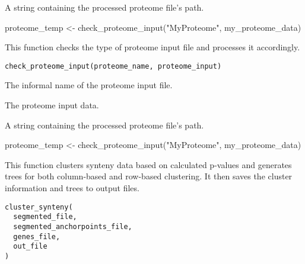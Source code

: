 \documentclass[a4paper]{book}
\begin{document}
%
\begin{Value}
A string containing the processed proteome file's path.
\end{Value}
%
\begin{Examples}
\begin{ExampleCode}
proteome_temp <- check_proteome_input("MyProteome", my_proteome_data)
\end{ExampleCode}
\end{Examples}
%
\begin{Description}\relax
This function checks the type of proteome input file and processes it accordingly.
\end{Description}
%
\begin{Usage}
\begin{verbatim}
check_proteome_input(proteome_name, proteome_input)
\end{verbatim}
\end{Usage}
%
\begin{Arguments}
\begin{ldescription}
\item[\code{proteome\_name}] The informal name of the proteome input file.

\item[\code{proteome\_input}] The proteome input data.
\end{ldescription}
\end{Arguments}
%
\begin{Value}
A string containing the processed proteome file's path.
\end{Value}
%
\begin{Examples}
\begin{ExampleCode}
proteome_temp <- check_proteome_input("MyProteome", my_proteome_data)
\end{ExampleCode}
\end{Examples}
%
\begin{Description}\relax
This function clusters synteny data based on calculated p-values and generates trees
for both column-based and row-based clustering. It then saves the cluster information and
trees to output files.
\end{Description}
%
\begin{Usage}
\begin{verbatim}
cluster_synteny(
  segmented_file,
  segmented_anchorpoints_file,
  genes_file,
  out_file
)
\end{verbatim}
\end{Usage}
\end{document}

